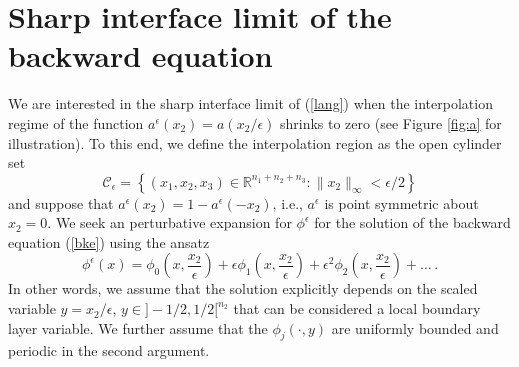 \documentclass{amsart}
\newcommand{\R}{{\mathbb R}}
\newcommand{\cC}{{\mathcal C}}
\newcommand{\eps}{\epsilon}
\begin{document}
\section{Sharp interface limit of the backward equation}

We are interested in the sharp interface limit of (\ref{lang}) when the interpolation regime of the function $a^{\eps}(x_{2})=a(x_{2}/\eps)$ shrinks to zero  (see Figure \ref{fig:a} for illustration). To this end, we define the interpolation region as the open cylinder set 
\begin{equation*}
\cC_{\eps} = \left\{(x_{1},x_{2},x_{3})\in\R^{n_{1}+n_{2}+n_{3}}\colon \|x_{2}\|_{\infty} < \eps/2 \right\} 
\end{equation*}
and suppose that $a^{\eps}(x_{2})=1-a^{\eps}(-x_{2})$, i.e., $a^{\eps}$ is point symmetric about $x_{2}=0$. We seek an perturbative expansion for $\phi^{\eps}$ for the solution of the backward equation (\ref{bke}) using the ansatz
\begin{equation*}
\phi^{\eps}(x) = \phi_{0}\left(x,\frac{x_{2}}{\eps}\right)+\eps\phi_{1}\left(x,\frac{x_{2}}{\eps}\right)+\eps^{2}\phi_{2}\left(x,\frac{x_{2}}{\eps}\right)+\ldots\,.
\end{equation*}
In other words, we assume that the solution explicitly depends on the scaled variable $y=x_{2}/\eps$, $y\in ]-1/2,1/2[^{n_{2}}$ that can be considered a local boundary layer variable. We further assume that the $\phi_{j}(\cdot,y)$ are uniformly bounded and periodic in the second argument. 
\end{document}
